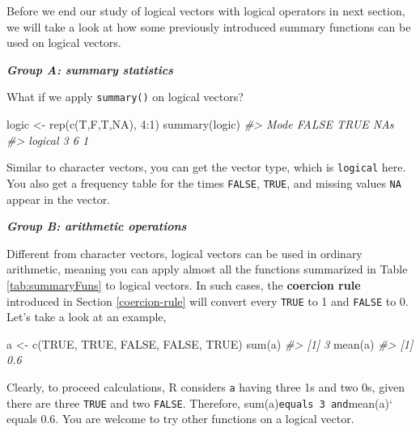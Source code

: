 \documentclass[
]{book}
\newenvironment{Shaded}{\begin{snugshade}}{\end{snugshade}}
\newcommand{\CommentTok}[1]{\textcolor[rgb]{0.56,0.35,0.01}{\textit{#1}}}
\newcommand{\ConstantTok}[1]{\textcolor[rgb]{0.00,0.00,0.00}{#1}}
\newcommand{\DecValTok}[1]{\textcolor[rgb]{0.00,0.00,0.81}{#1}}
\newcommand{\FunctionTok}[1]{\textcolor[rgb]{0.00,0.00,0.00}{#1}}
\newcommand{\NormalTok}[1]{#1}
\newcommand{\OtherTok}[1]{\textcolor[rgb]{0.56,0.35,0.01}{#1}}
\newcommand{\SpecialCharTok}[1]{\textcolor[rgb]{0.00,0.00,0.00}{#1}}
\begin{document}
Before we end our study of logical vectors with logical operators in next section, we will take a look at how some previously introduced summary functions can be used on logical vectors.

\textbf{\emph{Group A: summary statistics}}

What if we apply \texttt{summary()} on logical vectors?

\begin{Shaded}
\begin{Highlighting}[]
\NormalTok{logic }\OtherTok{\textless{}{-}} \FunctionTok{rep}\NormalTok{(}\FunctionTok{c}\NormalTok{(T,F,T,}\ConstantTok{NA}\NormalTok{), }\DecValTok{4}\SpecialCharTok{:}\DecValTok{1}\NormalTok{)}
\FunctionTok{summary}\NormalTok{(logic)}
\CommentTok{\#\textgreater{}    Mode   FALSE    TRUE    NA\textquotesingle{}s }
\CommentTok{\#\textgreater{} logical       3       6       1}
\end{Highlighting}
\end{Shaded}

Similar to character vectors, you can get the vector type, which is \texttt{logical} here. You also get a frequency table for the times \texttt{FALSE}, \texttt{TRUE}, and missing values \texttt{NA} appear in the vector.

\textbf{\emph{Group B: arithmetic operations}}

Different from character vectors, logical vectors can be used in ordinary arithmetic, meaning you can apply almost all the functions summarized in Table \ref{tab:summaryFuns} to logical vectors. In such cases, the \textbf{coercion rule} introduced in Section \ref{coercion-rule} will convert every \texttt{TRUE} to 1 and \texttt{FALSE} to 0. Let's take a look at an example,

\begin{Shaded}
\begin{Highlighting}[]
\NormalTok{a }\OtherTok{\textless{}{-}} \FunctionTok{c}\NormalTok{(}\ConstantTok{TRUE}\NormalTok{, }\ConstantTok{TRUE}\NormalTok{, }\ConstantTok{FALSE}\NormalTok{, }\ConstantTok{FALSE}\NormalTok{, }\ConstantTok{TRUE}\NormalTok{)}
\FunctionTok{sum}\NormalTok{(a)}
\CommentTok{\#\textgreater{} [1] 3}
\FunctionTok{mean}\NormalTok{(a)}
\CommentTok{\#\textgreater{} [1] 0.6}
\end{Highlighting}
\end{Shaded}

Clearly, to proceed calculations, R considers \texttt{a} having three 1s and two 0s, given there are three \texttt{TRUE} and two \texttt{FALSE}. Therefore, sum(a)\texttt{equals\ 3\ and}mean(a)` equals 0.6. You are welcome to try other functions on a logical vector.
\end{document}
